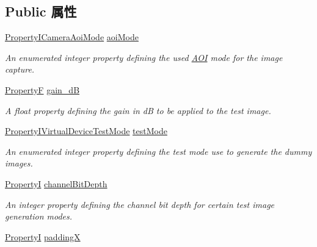 \subsection*{Public 属性}
\begin{DoxyCompactItemize}
\item 
\hyperlink{group___device_specific_interface_gac3481ade98270de3d8aa7ae47cbe5c4e}{Property\+I\+Camera\+Aoi\+Mode} \hyperlink{classmv_i_m_p_a_c_t_1_1acquire_1_1_camera_settings_virtual_device_acdafab3d8e09657de37e15f066c41d33}{aoi\+Mode}
\begin{DoxyCompactList}\small\item\em An enumerated integer property defining the used \hyperlink{struct_a_o_i}{A\+O\+I} mode for the image capture. \end{DoxyCompactList}\item 
\hyperlink{group___common_interface_gaf54865fe5a3d5cfd15f9a111b40d09f9}{Property\+F} \hyperlink{classmv_i_m_p_a_c_t_1_1acquire_1_1_camera_settings_virtual_device_a4337e2da0e836c79f18b619dc68d8681}{gain\+\_\+d\+B}
\begin{DoxyCompactList}\small\item\em A float property defining the gain in d\+B to be applied to the test image. \end{DoxyCompactList}\item 
\hyperlink{group___device_specific_interface_ga3e8eeaeee6e265c687f5f1bcc8f086a6}{Property\+I\+Virtual\+Device\+Test\+Mode} \hyperlink{classmv_i_m_p_a_c_t_1_1acquire_1_1_camera_settings_virtual_device_a804a5ef868aaf896d39986547d8407f6}{test\+Mode}
\begin{DoxyCompactList}\small\item\em An enumerated integer property defining the test mode use to generate the dummy images. \end{DoxyCompactList}\item 
\hyperlink{group___common_interface_ga12d5e434238ca242a1ba4c6c3ea45780}{Property\+I} \hyperlink{classmv_i_m_p_a_c_t_1_1acquire_1_1_camera_settings_virtual_device_aa8d2e4f540d6c550d7ef0140260d3d91}{channel\+Bit\+Depth}
\begin{DoxyCompactList}\small\item\em An integer property defining the channel bit depth for certain test image generation modes. \end{DoxyCompactList}\item 
\hyperlink{group___common_interface_ga12d5e434238ca242a1ba4c6c3ea45780}{Property\+I} \hyperlink{classmv_i_m_p_a_c_t_1_1acquire_1_1_camera_settings_virtual_device_a0aeed2e2b157d75a0e3f6fe1914c3328}{padding\+X}

\end{DoxyCompactItemize}
